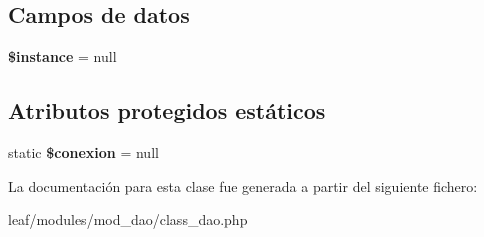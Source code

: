 \subsection*{Campos de datos}
\begin{DoxyCompactItemize}
\item 
\hypertarget{classdao_ad9d7ce33ebb142b70e58b68052ca0ea8}{{\bfseries \$instance} = null}\label{classdao_ad9d7ce33ebb142b70e58b68052ca0ea8}

\end{DoxyCompactItemize}
\subsection*{Atributos protegidos estáticos}
\begin{DoxyCompactItemize}
\item 
\hypertarget{classdao_a881924afaecbe8ee5c0d26174a1e8081}{static {\bfseries \$conexion} = null}\label{classdao_a881924afaecbe8ee5c0d26174a1e8081}

\end{DoxyCompactItemize}


La documentación para esta clase fue generada a partir del siguiente fichero\-:\begin{DoxyCompactItemize}
\item 
leaf/modules/mod\-\_\-dao/class\-\_\-dao.\-php\end{DoxyCompactItemize}
